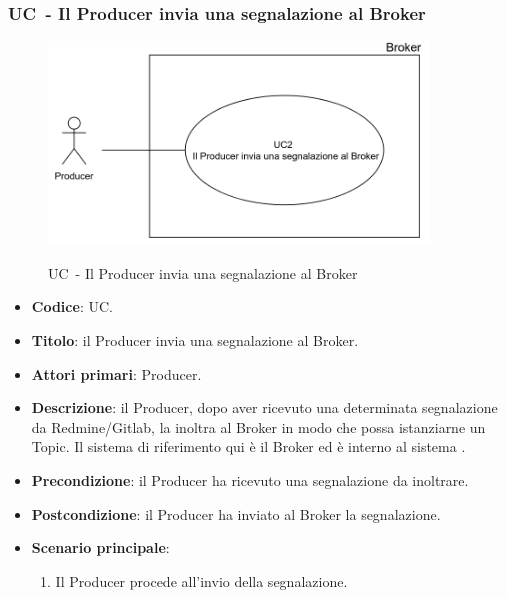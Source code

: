 \subsubsection{UC\theuccount\ - Il Producer invia una segnalazione al Broker}
	\begin{figure}[H]
		\centering
		\includegraphics[width=0.9\textwidth]{img/UC2Producer.png}\\
		\caption{UC\theuccount\ - Il Producer invia una segnalazione al Broker}
	\end{figure}
	\begin{itemize}
		\item \textbf{Codice}: UC\theuccount.
		\item \textbf{Titolo}: il Producer invia una segnalazione al Broker.
		\item \textbf{Attori primari}: Producer.
		\item \textbf{Descrizione}: il Producer, dopo aver ricevuto una determinata segnalazione da Redmine/Gitlab, la inoltra al Broker in modo che possa istanziarne un Topic. Il sistema di riferimento qui è il Broker ed è interno al sistema \progetto.
		\item \textbf{Precondizione}: il Producer ha ricevuto una segnalazione da inoltrare.
		\item \textbf{Postcondizione}: il Producer ha inviato al Broker la segnalazione.
		\item \textbf{Scenario principale}:
		\begin{enumerate}
			\item Il Producer procede all'invio della segnalazione.
		\end{enumerate}
		 
	\end{itemize}


